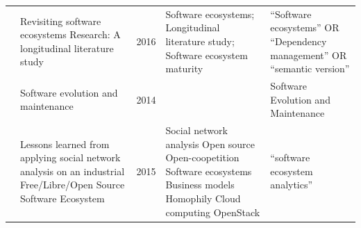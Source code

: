 \documentclass[]{book}
\begin{document}
\begin{longtable}[]{@{}lllll@{}}
\begin{minipage}[t]{0.05\columnwidth}
\citet{Manikas2016}\strut
\end{minipage} & \begin{minipage}[t]{0.31\columnwidth}\raggedright\strut
Revisiting software ecosystems Research: A longitudinal literature
study\strut
\end{minipage} & \begin{minipage}[t]{0.02\columnwidth}\raggedright\strut
2016\strut
\end{minipage} & \begin{minipage}[t]{0.34\columnwidth}\raggedright\strut
Software ecosystems; Longitudinal literature study; Software ecosystem
maturity\strut
\end{minipage} & \begin{minipage}[t]{0.13\columnwidth}\raggedright\strut
``Software ecosystems'' OR ``Dependency management'' OR ``semantic
version''\strut
\end{minipage}\tabularnewline
\begin{minipage}[t]{0.05\columnwidth}\raggedright\strut
\citet{Rajlich2014}\strut
\end{minipage} & \begin{minipage}[t]{0.31\columnwidth}\raggedright\strut
Software evolution and maintenance\strut
\end{minipage} & \begin{minipage}[t]{0.02\columnwidth}\raggedright\strut
2014\strut
\end{minipage} & \begin{minipage}[t]{0.34\columnwidth}\raggedright\strut
\strut
\end{minipage} & \begin{minipage}[t]{0.13\columnwidth}\raggedright\strut
Software Evolution and Maintenance\strut
\end{minipage}\tabularnewline
\begin{minipage}[t]{0.05\columnwidth}\raggedright\strut
\citet{Teixeira2015}\strut
\end{minipage} & \begin{minipage}[t]{0.31\columnwidth}\raggedright\strut
Lessons learned from applying social network analysis on an industrial
Free/Libre/Open Source Software Ecosystem\strut
\end{minipage} & \begin{minipage}[t]{0.02\columnwidth}\raggedright\strut
2015\strut
\end{minipage} & \begin{minipage}[t]{0.34\columnwidth}\raggedright\strut
Social network analysis Open source Open-coopetition Software ecosystems
Business models Homophily Cloud computing OpenStack\strut
\end{minipage} & \begin{minipage}[t]{0.13\columnwidth}\raggedright\strut
``software ecosystem analytics''\strut
\end{minipage}\tabularnewline
\bottomrule
\end{longtable}
\end{document}
